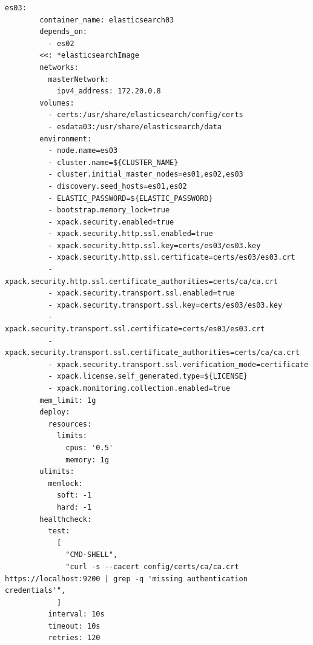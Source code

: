 \begin{lstlisting}[caption=Plik docker-comose.yml, label=dockerComposeFile]
      es03:
        container_name: elasticsearch03
        depends_on:
          - es02
        <<: *elasticsearchImage
        networks:
          masterNetwork:
            ipv4_address: 172.20.0.8
        volumes:
          - certs:/usr/share/elasticsearch/config/certs
          - esdata03:/usr/share/elasticsearch/data
        environment:
          - node.name=es03
          - cluster.name=${CLUSTER_NAME}
          - cluster.initial_master_nodes=es01,es02,es03
          - discovery.seed_hosts=es01,es02
          - ELASTIC_PASSWORD=${ELASTIC_PASSWORD}
          - bootstrap.memory_lock=true
          - xpack.security.enabled=true
          - xpack.security.http.ssl.enabled=true
          - xpack.security.http.ssl.key=certs/es03/es03.key
          - xpack.security.http.ssl.certificate=certs/es03/es03.crt
          - xpack.security.http.ssl.certificate_authorities=certs/ca/ca.crt
          - xpack.security.transport.ssl.enabled=true
          - xpack.security.transport.ssl.key=certs/es03/es03.key
          - xpack.security.transport.ssl.certificate=certs/es03/es03.crt
          - xpack.security.transport.ssl.certificate_authorities=certs/ca/ca.crt
          - xpack.security.transport.ssl.verification_mode=certificate
          - xpack.license.self_generated.type=${LICENSE}
          - xpack.monitoring.collection.enabled=true
        mem_limit: 1g
        deploy:
          resources:
            limits:
              cpus: '0.5'
              memory: 1g
        ulimits:
          memlock:
            soft: -1
            hard: -1
        healthcheck:
          test:
            [
              "CMD-SHELL",
              "curl -s --cacert config/certs/ca/ca.crt https://localhost:9200 | grep -q 'missing authentication credentials'",
            ]
          interval: 10s
          timeout: 10s
          retries: 120
    

\end{lstlisting}
